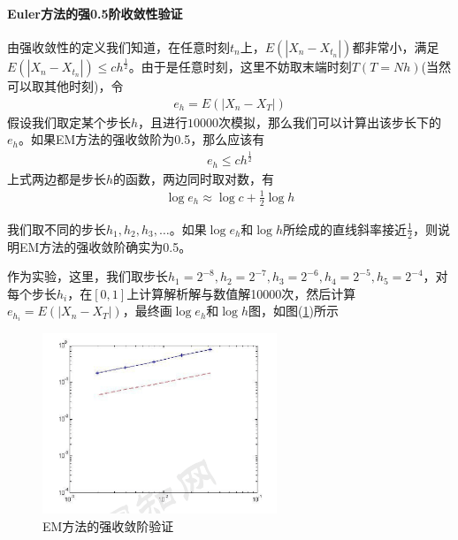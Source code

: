             \paragraph{Euler方法的强0.5阶收敛性验证}
            由强收敛性的定义我们知道，在任意时刻$t_n$上，$E(|X_n - X_{t_n}|)$都非常小，满足$E(|X_n - X_{t_n}|) \leqslant ch^\frac{1}{2}$。由于是任意时刻，这里不妨取末端时刻$T(T = Nh)$(当然可以取其他时刻)，令
            \begin{align*}
            e_h = E(|X_n - X_{T}|)
            \end{align*}
            假设我们取定某个步长$h$，且进行$10000$次模拟，那么我们可以计算出该步长下的$e_h$。如果EM方法的强收敛阶为0.5，那么应该有
            \begin{align*}
            e_h \leqslant ch^\frac{1}{2}
            \end{align*}
            上式两边都是步长$h$的函数，两边同时取对数，有
            \begin{align*}
            \log e_h \approx \log c + \frac 12 \log h
            \end{align*}
            \par
            我们取不同的步长$h_1,h_2,h_3,\dots$。如果$\log e_h$和$\log h$所绘成的直线斜率接近$\frac 12$，则说明EM方法的强收敛阶确实为0.5。
            \par
            作为实验，这里，我们取步长$h_1 = 2^{-8},h_2 = 2^{-7},h_3 = 2^{-6},h_4 = 2^{-5},h_5 = 2^{-4}$，对每个步长$h_i$，在$[0,1]$上计算解析解与数值解10000次，然后计算$e_{h_i} = E(|X_n - X_T|) $，最终画$\log e_h$和$\log h$图，如图(\ref{fig:EM方法的强收敛阶验证})所示
           \begin{figure}[H]
           \centering
           \includegraphics[width=7cm]{images/EM_Strong_convergence_prove.png}
           \caption{EM方法的强收敛阶验证}
           \label{fig:EM方法的强收敛阶验证}
           \end{figure}

